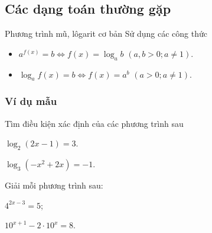 \subsection{Các dạng toán thường gặp}
\begin{dang}{Phương trình mũ, lôgarit cơ bản}
	Sử dụng các công thức
	\begin{itemize}
		\item $a^{f(x)}=b \Leftrightarrow f(x)=\log_a b$ $(a,b>0; a\neq 1)$.
		\item $\log_a f(x)=b\Leftrightarrow f(x)=a^b$ $(a>0;a\neq 1)$.
	\end{itemize}
\end{dang}
\subsubsection{Ví dụ mẫu}

\begin{vd}%
	Tìm điều kiện xác định của các phương trình sau
	\begin{listEX}[2]
		\item $\log_2(2x-1)=3$.
		\item $\log_3\left(-x^2+2x\right)=-1$.
	\end{listEX}
\end{vd}

\begin{vd} %
	Giải mỗi phương trình sau:
	\begin{listEX}[2]
		\item $4^{2x-3}=5$;
		\item $10^{x+1}-2\cdot 10^x=8$.
	\end{listEX}
\end{vd}

